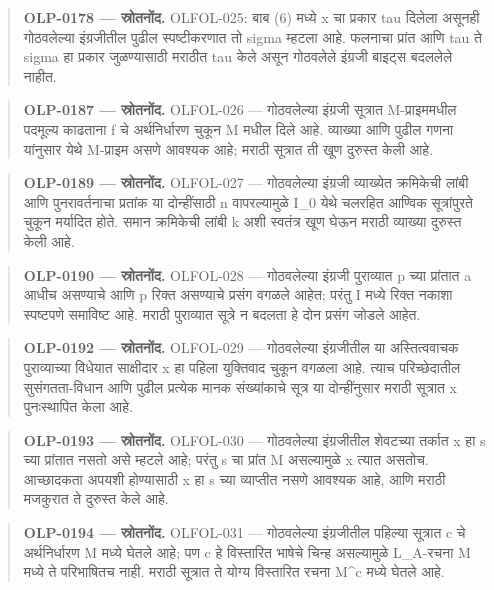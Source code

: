 \begin{quote}\small\textbf{OLP-0178 — स्रोतनोंद.} OLFOL-025: बाब (6) मध्ये x चा प्रकार tau दिलेला असूनही गोठवलेल्या इंग्रजीतील पुढील स्पष्टीकरणात तो sigma म्हटला आहे. फलनाचा प्रांत आणि tau ते sigma हा प्रकार जुळण्यासाठी मराठीत tau केले असून गोठवलेले इंग्रजी बाइट्स बदललेले नाहीत.\end{quote}
\begin{quote}\small\textbf{OLP-0187 — स्रोतनोंद.} OLFOL-026 — गोठवलेल्या इंग्रजी सूत्रात M-प्राइममधील पदमूल्य काढताना f चे अर्थनिर्धारण चुकून M मधील दिले आहे. व्याख्या आणि पुढील गणना यांनुसार येथे M-प्राइम असणे आवश्यक आहे; मराठी सूत्रात ती खूण दुरुस्त केली आहे.\end{quote}
\begin{quote}\small\textbf{OLP-0189 — स्रोतनोंद.} OLFOL-027 — गोठवलेल्या इंग्रजी व्याख्येत क्रमिकेची लांबी आणि पुनरावर्तनाचा प्रतांक या दोन्हींसाठी n वापरल्यामुळे I\_0 येथे चलरहित आण्विक सूत्रांपुरते चुकून मर्यादित होते. समान क्रमिकेची लांबी k अशी स्वतंत्र खूण घेऊन मराठी व्याख्या दुरुस्त केली आहे.\end{quote}
\begin{quote}\small\textbf{OLP-0190 — स्रोतनोंद.} OLFOL-028 — गोठवलेल्या इंग्रजी पुराव्यात p च्या प्रांतात a आधीच असण्याचे आणि p रिक्त असण्याचे प्रसंग वगळले आहेत; परंतु I मध्ये रिक्त नकाशा स्पष्टपणे समाविष्ट आहे. मराठी पुराव्यात सूत्रे न बदलता हे दोन प्रसंग जोडले आहेत.\end{quote}
\begin{quote}\small\textbf{OLP-0192 — स्रोतनोंद.} OLFOL-029 — गोठवलेल्या इंग्रजीतील या अस्तित्ववाचक पुराव्याच्या विधेयात साक्षीदार x हा पहिला युक्तिवाद चुकून वगळला आहे. त्याच परिच्छेदातील सुसंगतता-विधान आणि पुढील प्रत्येक मानक संख्यांकाचे सूत्र या दोन्हींनुसार मराठी सूत्रात x पुनःस्थापित केला आहे.\end{quote}
\begin{quote}\small\textbf{OLP-0193 — स्रोतनोंद.} OLFOL-030 — गोठवलेल्या इंग्रजीतील शेवटच्या तर्कात x हा s च्या प्रांतात नसतो असे म्हटले आहे; परंतु s चा प्रांत M असल्यामुळे x त्यात असतोच. आच्छादकता अपयशी होण्यासाठी x हा s च्या व्याप्तीत नसणे आवश्यक आहे, आणि मराठी मजकुरात ते दुरुस्त केले आहे.\end{quote}
\begin{quote}\small\textbf{OLP-0194 — स्रोतनोंद.} OLFOL-031 — गोठवलेल्या इंग्रजीतील पहिल्या सूत्रात c चे अर्थनिर्धारण M मध्ये घेतले आहे; पण c हे विस्तारित भाषेचे चिन्ह असल्यामुळे L\_A-रचना M मध्ये ते परिभाषितच नाही. मराठी सूत्रात ते योग्य विस्तारित रचना M\textasciicircum{}c मध्ये घेतले आहे.\end{quote}

